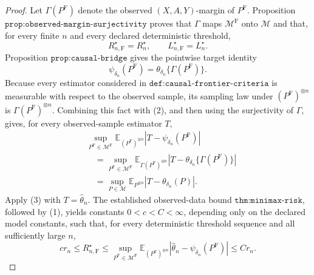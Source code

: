 \documentclass{article}
\begin{document}
\begin{proof}
Let \(\Gamma(P^{\mathrm F})\) denote the observed \((X,A,Y)\)-margin of \(P^{\mathrm F}\).  Proposition \(\texttt{prop:observed-margin-surjectivity}\) proves that \(\Gamma\) maps \(\mathcal M^{\mathrm F}\) onto \(\mathcal M\) and that, for every finite \(n\) and every declared deterministic threshold,
\[
 R_{n,\mathrm F}^\star=R_n^\star,
 \qquad
 L_{n,\mathrm F}^\star=L_n^\star. \tag{1}
\]
Proposition \(\texttt{prop:causal-bridge}\) gives the pointwise target identity
\[
 \psi_{\delta_n}(P^{\mathrm F})
 =\theta_{\delta_n}\{\Gamma(P^{\mathrm F})\}. \tag{2}
\]
Because every estimator considered in \(\texttt{def:causal-frontier-criteria}\) is measurable with respect to the observed sample, its sampling law under \((P^{\mathrm F})^{\otimes n}\) is \(\Gamma(P^{\mathrm F})^{\otimes n}\).  Combining this fact with (2), and then using the surjectivity of \(\Gamma\), gives, for every observed-sample estimator \(T\),
\[
 \begin{aligned}
 &\sup_{P^{\mathrm F}\in\mathcal M^{\mathrm F}}
 \mathbb E_{(P^{\mathrm F})^{\otimes n}}
 \left|T-\psi_{\delta_n}(P^{\mathrm F})\right| \\
 &\quad=
 \sup_{P^{\mathrm F}\in\mathcal M^{\mathrm F}}
 \mathbb E_{\Gamma(P^{\mathrm F})^{\otimes n}}
 \left|T-\theta_{\delta_n}\{\Gamma(P^{\mathrm F})\}\right| \\
 &\quad=
 \sup_{P\in\mathcal M}
 \mathbb E_{P^{\otimes n}}
 \left|T-\theta_{\delta_n}(P)\right|. \tag{3}
 \end{aligned}
\]
Apply (3) with \(T=\widehat\theta_n\).  The established observed-data bound \(\texttt{thm:minimax-risk}\), followed by (1), yields constants \(0<c<C<\infty\), depending only on the declared model constants, such that, for every deterministic threshold sequence and all sufficiently large \(n\),
\[
 c r_n
 \leq R_{n,\mathrm F}^\star
 \leq
 \sup_{P^{\mathrm F}\in\mathcal M^{\mathrm F}}
 \mathbb E_{(P^{\mathrm F})^{\otimes n}}
 \left|\widehat\theta_n-\psi_{\delta_n}(P^{\mathrm F})\right|
 \leq C r_n. \tag{4}
\]


\end{proof}
\end{document}

